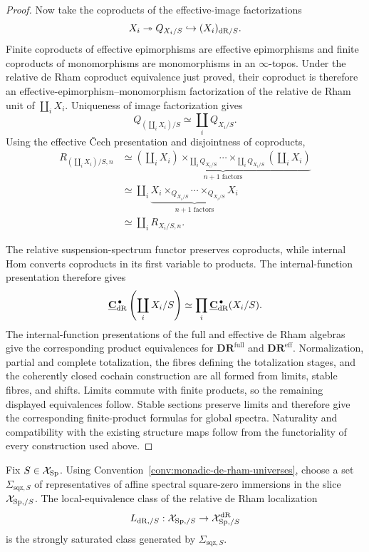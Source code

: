 \begin{proof}
Now take the coproducts of the effective-image factorizations
\[
    X_i\twoheadrightarrow Q_{X_i/S}\hookrightarrow(X_i)_{\mathrm{dR}/S}.
\]
Finite coproducts of effective epimorphisms are effective epimorphisms and finite coproducts of
monomorphisms are monomorphisms in an \(\infty\)-topos.  Under the relative de Rham coproduct
equivalence just proved, their coproduct is therefore an effective-epimorphism--monomorphism
factorization of the relative de Rham unit of \(\coprod_iX_i\).  Uniqueness of image factorization
gives
\[
    Q_{(\coprod_iX_i)/S}
    \simeq
    \coprod_iQ_{X_i/S}.
\]
Using the effective \v{C}ech presentation and disjointness of coproducts,
\[
\begin{aligned}
    R_{(\coprod_iX_i)/S,n}
    &\simeq
    \underbrace{
        \left(\coprod_iX_i\right)
        \times_{\coprod_iQ_{X_i/S}}\cdots
        \times_{\coprod_iQ_{X_i/S}}
        \left(\coprod_iX_i\right)
    }_{n+1\text{ factors}}
    \\
    &\simeq
    \coprod_i
    \underbrace{
        X_i\times_{Q_{X_i/S}}\cdots\times_{Q_{X_i/S}}X_i
    }_{n+1\text{ factors}}
    \\
    &\simeq
    \coprod_iR_{X_i/S,n}.
\end{aligned}
\]

The relative suspension-spectrum functor preserves coproducts, while internal Hom converts
coproducts in its first variable to products.  The internal-function presentation therefore gives
\[
    \underline{\mathbf C}_{\mathrm{dR}}^{\,\bullet}
    \left(\coprod_iX_i/S\right)
    \simeq
    \prod_i\underline{\mathbf C}_{\mathrm{dR}}^{\,\bullet}(X_i/S).
\]
The internal-function presentations of the full and effective de Rham algebras give the corresponding
product equivalences for \(\mathbf{DR}^{\mathrm{full}}\) and \(\mathbf{DR}^{\mathrm{eff}}\).
Normalization, partial and complete totalization, the fibres defining the totalization stages, and
the coherently closed cochain construction are all formed from limits, stable fibres, and shifts.
Limits commute with finite products, so the remaining displayed equivalences follow.  Stable sections
preserve limits and therefore give the corresponding finite-product formulas for global spectra.
Naturality and compatibility with the existing structure maps follow from the functoriality of every
construction used above.
\end{proof}

\begin{lemma}
\label{lem:relative-dr-generated-by-square-zero}
Fix \(S\in\mathcal X_{\mathrm{Sp}}\).  Using Convention~\ref{conv:monadic-de-rham-universes}, choose a
set \(\Sigma_{\mathrm{sqz},S}\) of representatives of affine spectral square-zero immersions in the
slice \(\mathcal X_{\mathrm{Sp},/S}\).  The local-equivalence
class of the relative de Rham localization
\[
    L_{\mathrm{dR},/S}:\mathcal X_{\mathrm{Sp},/S}\to\mathcal X_{\mathrm{Sp},/S}^{\mathrm{dR}}
\]
is the strongly saturated class generated by \(\Sigma_{\mathrm{sqz},S}\).
\end{lemma}

